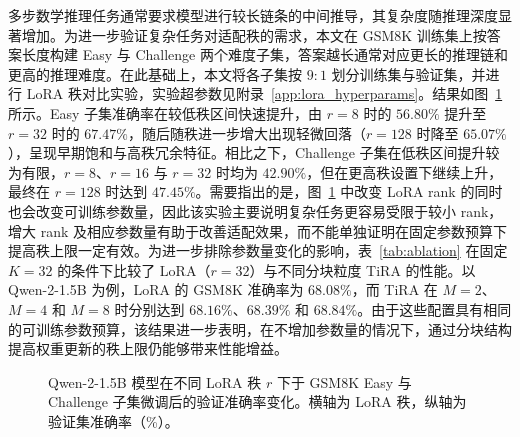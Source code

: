 ﻿\documentclass[UTF8,a4paper,11pt]{ctexart}
\begin{document}
多步数学推理任务通常要求模型进行较长链条的中间推导，其复杂度随推理深度显著增加。为进一步验证复杂任务对适配秩的需求，本文在 GSM8K\cite{cobbe2021gsm8k} 训练集上按答案长度构建 Easy 与 Challenge 两个难度子集，答案越长通常对应更长的推理链和更高的推理难度。在此基础上，本文将各子集按 $9:1$ 划分训练集与验证集，并进行 LoRA 秩对比实验，实验超参数见附录~\ref{app:lora_hyperparams}。结果如图~\ref{fig:rank_motivation} 所示。Easy 子集准确率在较低秩区间快速提升，由 $r=8$ 时的 $56.80\%$ 提升至 $r=32$ 时的 $67.47\%$，随后随秩进一步增大出现轻微回落（$r=128$ 时降至 $65.07\%$），呈现早期饱和与高秩冗余特征。相比之下，Challenge 子集在低秩区间提升较为有限，$r=8$、$r=16$ 与 $r=32$ 时均为 $42.90\%$，但在更高秩设置下继续上升，最终在 $r=128$ 时达到 $47.45\%$。需要指出的是，图~\ref{fig:rank_motivation} 中改变 LoRA rank 的同时也会改变可训练参数量，因此该实验主要说明复杂任务更容易受限于较小 rank，增大 rank 及相应参数量有助于改善适配效果，而不能单独证明在固定参数预算下提高秩上限一定有效。为进一步排除参数量变化的影响，表~\ref{tab:ablation} 在固定 $K=32$ 的条件下比较了 LoRA（$r=32$）与不同分块粒度 TiRA 的性能。以 Qwen-2-1.5B 为例，LoRA 的 GSM8K 准确率为 $68.08\%$，而 TiRA 在 $M=2$、$M=4$ 和 $M=8$ 时分别达到 $68.16\%$、$68.39\%$ 和 $68.84\%$。由于这些配置具有相同的可训练参数预算，该结果进一步表明，在不增加参数量的情况下，通过分块结构提高权重更新的秩上限仍能够带来性能增益。

\begin{figure}[H]
    \centering
    \caption{Qwen-2-1.5B 模型在不同 LoRA 秩 $r$ 下于 GSM8K Easy 与 Challenge 子集微调后的验证准确率变化。横轴为 LoRA 秩，纵轴为验证集准确率（\%）。}
    \label{fig:rank_motivation}
\end{figure}
\end{document}
